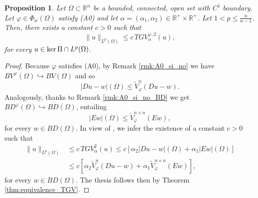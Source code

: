 \documentclass[a4paper,11pt,oneside,notitlepage]{article}
\newtheorem{proposition}[theorem]{Proposition}
\numberwithin{equation}{section}
\def\R{\mathbb{R}}
\def\ker{{\rm ker}}
\newcommand{\vphi}{\varphi}
\begin{document}
\begin{proposition}
\label{prop:PoincareTGV}
    Let $\Omega \subset \R^n$ be a bounded, connected, open set with $C^1$ boundary. Let $\vphi \in \Phi_w(\Omega)$ satisfy (A0) and let $\alpha = (\alpha_1, \alpha_2) \in \R^+ \times \R^+$. Let $1 < p \le \tfrac{n}{n-1}$. Then, there exists a constant $c > 0$ such that
    \begin{equation*}
        \|u\|_{L^p(\Omega)} \le c \,TGV^{\vphi,2}_\alpha(u),
    \end{equation*}
    for every $u \in \ker\,\Pi \cap L^p(\Omega)$.
\end{proposition}
\begin{proof}
    Because $\vphi$ satisfies (A0), by Remark \ref{rmk:A0_si_no} we have $BV^\vphi(\Omega) \hookrightarrow BV(\Omega)$ and so
    \begin{equation*}
        |Du - w|(\Omega) \le \widetilde{V}_\vphi^n(Du - w).
    \end{equation*}
    Analogously, thanks to Remark \ref{rmk:A0_si_no_BD} we get $BD^\vphi(\Omega) \hookrightarrow BD(\Omega)$, entailing
    \begin{equation*}
        |Ew|(\Omega) \le \widetilde{V}_\vphi^{n\times n}(Ew),
    \end{equation*}
    for every $w \in BD(\Omega)$. In view of \cite[Theorem 3.1 \& Proposition 4.1]{BV20}, we infer the existence of a constant $c > 0$ such that
    \begin{equation*}
    \begin{aligned}
        \|u\|_{L^p(\Omega)} 
        &\le c \, TGV^{2}_\alpha(u) \le c \left[ \alpha_2 |Du - w|(\Omega) + \alpha_1 |Ew|(\Omega) \right] \\
        &\le c \left[ \alpha_2 \widetilde{V}_\vphi^n(Du - w) + \alpha_1 \widetilde{V}_\vphi^{n \times n}(Ew) \right],
    \end{aligned}
    \end{equation*}
    for every $w \in BD(\Omega)$. The thesis follows then by Theorem \ref{thm:equivalence_TGV}.
\end{proof}
\end{document}
